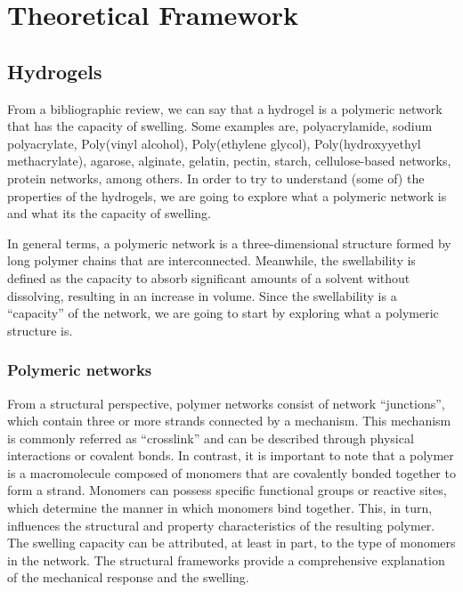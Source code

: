 \chapter{Theoretical Framework}\label{ch2:TheoFrame}

\section{Hydrogels}

From a bibliographic review, we can say that a hydrogel is a polymeric network that has the capacity of swelling\citep{choiSynthesisHydrogelBasedMicrogels2025,dayTunableNetworkArchitecture2025,ahmedHydrogelPreparationCharacterization2015a,bustamante-torresHydrogelsClassificationAccording2021}.
Some examples are,
polyacrylamide,
sodium polyacrylate,
Poly(vinyl alcohol),
Poly(ethylene glycol),
Poly(hydroxyyethyl methacrylate),
agarose,
alginate,
gelatin,
pectin,
starch,
cellulose-based networks,
protein networks,
among others.
In order to try to understand (some of) the properties of the hydrogels, we are going to explore what a polymeric network is and what its the capacity of swelling.

In general terms, a polymeric network is a three-dimensional structure formed by long polymer chains that are interconnected.
Meanwhile, the swellability is defined as the capacity to absorb significant amounts of a solvent without dissolving, resulting in an increase in volume.
Since the swellability is a ``capacity'' of the network\citep{bustamante-torresHydrogelsClassificationAccording2021}, we are going to start by exploring what a polymeric structure is.

\subsection{Polymeric networks}

From a structural perspective, polymer networks consist of network ``junctions'', which contain three or more strands connected by a mechanism.
This mechanism is commonly referred as ``crosslink'' and can be described through physical interactions or covalent bonds.
In contrast, it is important to note that a polymer is a macromolecule composed of monomers that are covalently bonded together to form a strand.
Monomers can possess specific functional groups or reactive sites, which determine the manner in which monomers bind together.
This, in turn, influences the structural and property characteristics of the resulting polymer.
The swelling capacity can be attributed, at least in part, to the type of monomers in the network.
The structural frameworks provide a comprehensive explanation of the mechanical response and the swelling.

